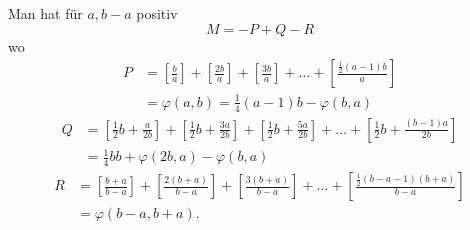 Man hat für $a,b-a$ positiv
\[
M=-P+Q-R
\]
\noindent wo
\[
\begin{aligned}
P&=\left[\frac ba\right]+\left[\frac{2b}a\right]+\left[\frac{3b}a\right]+\ldots+\left[\frac{\tfrac12(a-1)b}a\right]\\
&=\varphi(a,b)=\tfrac14(a-1)b-\varphi(b,a)
\end{aligned}
\]
\[
\begin{aligned}
Q&=\left[\tfrac12b+\frac a{2b}\right]+\left[\tfrac12b+\frac{3a}{2b}\right]+\left[\tfrac12b+\frac{5a}{2b}\right]+\ldots+\left[\tfrac12b+\frac{(b-1)a}{2b}\right]\\
&=\tfrac14bb+\varphi(2b,a)-\varphi(b,a)
\end{aligned}
\]
\[
\begin{aligned}
R&=\left[\frac{b+a}{b-a}\right]+\left[\frac{2(b+a)}{b-a}\right]+\left[\frac{3(b+a)}{b-a}\right]+\ldots+\left[\frac{\tfrac12(b-a-1)(b+a)}{b-a}\right]\\
&=\varphi(b-a,b+a).
\end{aligned}
\]
\clearpage
